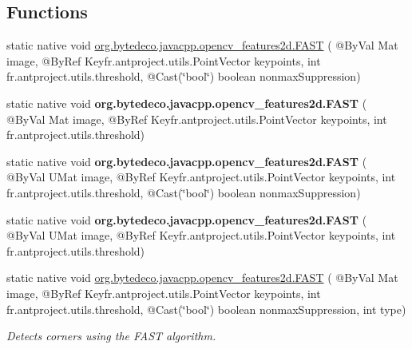 \subsection*{Functions}
\begin{DoxyCompactItemize}
\item 
static native void \hyperlink{group__features2d__main_gabceff7e5d16ac9f888fa12e3e8a3f39e}{org.\+bytedeco.\+javacpp.\+opencv\+\_\+features2d.\+F\+A\+ST} ( @By\+Val Mat image, @By\+Ref Key\+fr.antproject.utils.Point\+Vector keypoints, int fr.antproject.utils.threshold, @Cast(\char`\"{}bool\char`\"{}) boolean nonmax\+Suppression)
\item 
\mbox{\label{group__features2d__main_gaf0c4ad9499537ff96b8de123cae0fda3}} 
static native void {\bfseries org.\+bytedeco.\+javacpp.\+opencv\+\_\+features2d.\+F\+A\+ST} ( @By\+Val Mat image, @By\+Ref Key\+fr.antproject.utils.Point\+Vector keypoints, int fr.antproject.utils.threshold)
\item 
\mbox{\label{group__features2d__main_ga3fc49a28e6f2b9c04a3c2ea69347d380}} 
static native void {\bfseries org.\+bytedeco.\+javacpp.\+opencv\+\_\+features2d.\+F\+A\+ST} ( @By\+Val U\+Mat image, @By\+Ref Key\+fr.antproject.utils.Point\+Vector keypoints, int fr.antproject.utils.threshold, @Cast(\char`\"{}bool\char`\"{}) boolean nonmax\+Suppression)
\item 
\mbox{\label{group__features2d__main_ga9390c79e9e48ccd04748f933d7376f38}} 
static native void {\bfseries org.\+bytedeco.\+javacpp.\+opencv\+\_\+features2d.\+F\+A\+ST} ( @By\+Val U\+Mat image, @By\+Ref Key\+fr.antproject.utils.Point\+Vector keypoints, int fr.antproject.utils.threshold)
\item 
static native void \hyperlink{group__features2d__main_ga7b940fc6d27c261d531040a7f8dd22af}{org.\+bytedeco.\+javacpp.\+opencv\+\_\+features2d.\+F\+A\+ST} ( @By\+Val Mat image, @By\+Ref Key\+fr.antproject.utils.Point\+Vector keypoints, int fr.antproject.utils.threshold, @Cast(\char`\"{}bool\char`\"{}) boolean nonmax\+Suppression, int type)
\begin{DoxyCompactList}\small\item\em Detects corners using the F\+A\+ST algorithm. \end{DoxyCompactList}\item 
\mbox{\label{group__features2d__main_gaeec7bd1fd050f5aab2b5661e14277750}} 

\end{DoxyCompactItemize}
